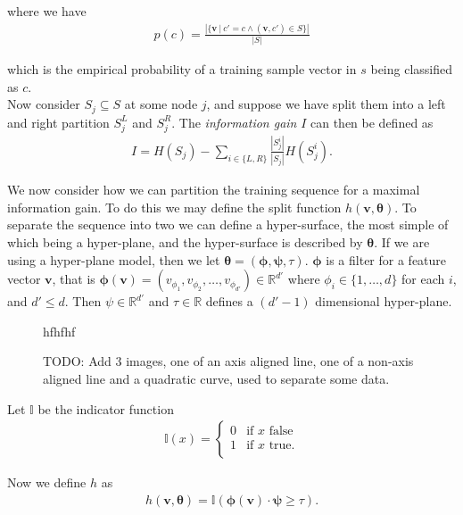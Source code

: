 \documentclass{article}
\newcommand{\vc}[1]{
    \mathbf{#1}
 }
\theoremstyle{definition}
\begin{document}
where we have
\begin{align}
    p(c) = \frac{\left| \{\vc{v}\ |\ c' = c \land (\vc{v},c') \in S \} \right|}{\left| S \right|}
\end{align}

which is the empirical probability of a training sample vector in $s$ being classified as $c$. \\

Now consider $S_j \subseteq S$ at some node $j$, and suppose we have split them into a left and right partition $S_j^L$ and 
$S_j^R$. The \textit{information gain} $I$ can then be defined as
\begin{align}
    I = H(S_j) - \sum_{i\in\{L,R\}} \frac{|S_j^i|}{|S_j|} H(S_j^i). \label{eq:InformationGain}
\end{align}

We now consider how we can partition the training sequence for a maximal information gain. To do this we may define the 
split function $h(\vc{v}, \vc{\theta})$. To separate the sequence into two we can define a hyper-surface, the 
most simple of which being a hyper-plane, and the hyper-surface is described by $\vc{\theta}$. If we 
are using a hyper-plane model, then we let $\vc{\theta} = (\vc{\phi}, \vc{\psi}, \tau)$. $\vc{\phi}$ is 
a filter for a feature vector $\vc{v}$, that is $\vc{\phi}(\vc{v}) = (v_{\phi_1}, v_{\phi_2}, \ldots, 
v_{\phi_{d'}}) \in \mathbb{R}^{d'}$ where $\phi_i \in \{1, \ldots, d\}$ for each $i$, and $d' \leq d$. Then 
$\psi \in \mathbb{R}^{d'}$ and $\tau \in \mathbb{R}$ defines a $(d'-1)$ dimensional hyper-plane. \\

\begin{figure}[H]
    \centering
    hfhfhf
    \caption{TODO: Add 3 images, one of an axis aligned line, one of a non-axis aligned line and a quadratic curve, 
    used to separate some data.}
\end{figure}

Let $\mathbb{I}$ be the indicator function
\begin{align}
    \mathbb{I}(x) = \begin{cases}
        0 & \text{if } x \text{ false} \\
        1 & \text{if } x \text{ true.} \\
    \end{cases}
\end{align}

Now we define $h$ as
\begin{align}
    h(\vc{v}, \vc{\theta}) = \mathbb{I}(\vc{\phi}(\vc{v}) \cdot \vc{\psi} \geq \tau).
\end{align}
\end{document}
